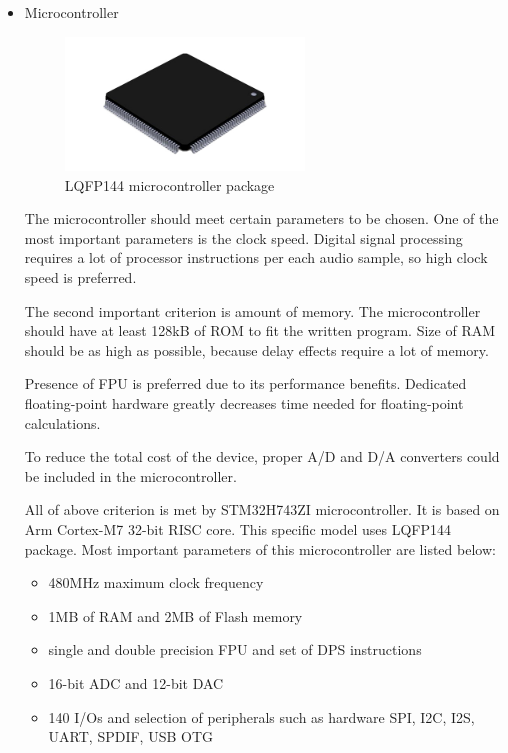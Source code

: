 \documentclass[a4paper,twoside,12pt]{book}
\begin{document}
\begin{itemize}
    \item Microcontroller
    
    \begin{figure}[H]
        \centering
        \includegraphics[width=0.6\textwidth]{images/lqfp}
        \caption{LQFP144 microcontroller package}
        \label{fig:LQFP}
    \end{figure}

    The microcontroller should meet certain parameters to be chosen.
    One of the most important parameters is the clock speed.
    Digital signal processing requires a lot of processor instructions
    per each audio sample, so high clock speed is preferred.

    The second important criterion is amount of memory.
    The microcontroller should have at least 128kB of ROM
    to fit the written program.
    Size of RAM should be as high as possible,
    because delay effects require a lot of memory.

    Presence of FPU is preferred due to its performance benefits.
    Dedicated floating-point hardware greatly decreases time
    needed for floating-point calculations.

    To reduce the total cost of the device,
    proper A/D and D/A converters could be included in the microcontroller.

    All of above criterion is met by STM32H743ZI microcontroller.
    It is based on Arm Cortex-M7 32-bit RISC core.
    This specific model uses LQFP144 package.
    Most important parameters of this microcontroller are listed below:
    \begin{itemize}
        \item 480MHz maximum clock frequency
        \item 1MB of RAM and 2MB of Flash memory
        \item single and double precision FPU and set of DPS instructions
        \item 16-bit ADC and 12-bit DAC
        \item 140 I/Os and selection of peripherals such as hardware
        SPI, I2C, I2S, UART, SPDIF, USB OTG
    \end{itemize}


\end{itemize}
\end{document}
